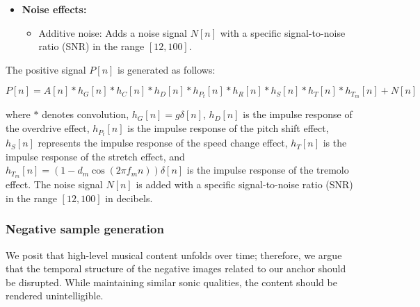 \begin{itemize}
\item \textbf{Noise effects:}
\begin{itemize}
    \item Additive noise: Adds a noise signal $N[n]$ with a specific signal-to-noise ratio (SNR) in the range $[12, 100]$.
\end{itemize}
\end{itemize}

The positive signal $P[n]$ is generated as follows:

\begin{equation}\label{eq:positive_signal}
P[n] = A[n] \ast h_{G}[n] \ast h_{C}[n] \ast h_{D}[n] \ast h_{P_t}[n] \ast h_{R}[n] \ast h_{S}[n] \ast h_{T}[n] \ast h_{T_m}[n] + N[n]
\end{equation}

where $\ast$ denotes convolution, $h_{G}[n] = g \delta[n]$, $h_{D}[n]$ is the impulse response of the overdrive effect, $h_{P_t}[n]$ is the impulse response of the pitch shift effect, $h_{S}[n]$ represents the impulse response of the speed change effect, $h_{T}[n]$ is the impulse response of the stretch effect, and $h_{T_m}[n] = (1 - d_m \cos(2 \pi f_m n))\delta[n]$ is the impulse response of the tremolo effect. The noise signal $N[n]$ is added with a specific signal-to-noise ratio (SNR) in the range $[12, 100]$ in decibels.

\subsubsection{Negative sample generation}

We posit that high-level musical content unfolds over time; therefore, we argue that the temporal structure of the negative images related to our anchor should be disrupted. While maintaining similar sonic qualities, the content should be rendered unintelligible.

